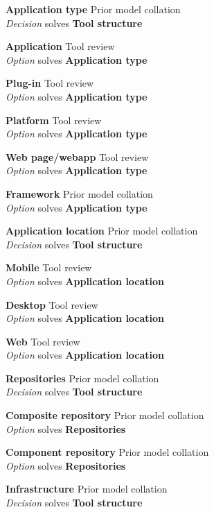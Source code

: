 \textbf{Application type} \hfill Prior model collation \cite{Minhas2012} \\ \emph{Decision} \hfill solves \textbf{Tool structure}

\textbf{Application} \hfill Tool review \\ \emph{Option} \hfill solves \textbf{Application type}

\textbf{Plug-in} \hfill Tool review \\ \emph{Option} \hfill solves \textbf{Application type}

\textbf{Platform} \hfill Tool review \\ \emph{Option} \hfill solves \textbf{Application type}

\textbf{Web page/webapp} \hfill Tool review \\ \emph{Option} \hfill solves \textbf{Application type}

\textbf{Framework} \hfill Prior model collation \cite{Minhas2012} \\ \emph{Option} \hfill solves \textbf{Application type}

\textbf{Application location} \hfill Prior model collation \cite{Bronsted2010a} \\ \emph{Decision} \hfill solves \textbf{Tool structure}

\textbf{Mobile} \hfill Tool review \\ \emph{Option} \hfill solves \textbf{Application location}

\textbf{Desktop} \hfill Tool review \\ \emph{Option} \hfill solves \textbf{Application location}

\textbf{Web} \hfill Tool review \\ \emph{Option} \hfill solves \textbf{Application location}

\textbf{Repositories} \hfill Prior model collation \cite{Pietschmann2010} \\ \emph{Decision} \hfill solves \textbf{Tool structure}

\textbf{Composite repository} \hfill Prior model collation \cite{Pietschmann2010} \\ \emph{Option} \hfill solves \textbf{Repositories}

\textbf{Component repository} \hfill Prior model collation \cite{Pietschmann2010} \\ \emph{Option} \hfill solves \textbf{Repositories}

\textbf{Infrastructure} \hfill Prior model collation \cite{Bronsted2010a} \\ \emph{Decision} \hfill solves \textbf{Tool structure}

